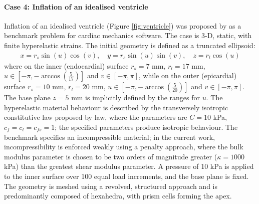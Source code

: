 \documentclass[sn-mathphys,Numbered]{sn-jnl}%
\begin{document}



\paragraph{Case 4: Inflation of an idealised ventricle}
Inflation of an idealised ventricle (Figure \ref{fig:ventricle}) was proposed by \citet{Land2015} as a benchmark problem for cardiac mechanics software.
The case is 3-D, static, with finite hyperelastic strains.
The initial geometry is defined as a truncated ellipsoid:
\begin{eqnarray}
	x = r_s \sin(u) \cos(v), \quad
	y = r_s \sin(u) \sin(v), \quad
	z = r_l \cos(u)
\end{eqnarray}
where on the inner (endocardial) surface $r_s =7$ mm, $r_l = 17$ mm, $u \in \left[-\pi, -\arccos \left( \frac{5}{17} \right) \right]$ and $v \in \left[-\pi, \pi \right]$, while on the outer (epicardial) surface $r_s =10$ mm, $r_l = 20$ mm, $u \in \left[-\pi, -\arccos \left( \frac{5}{20} \right) \right]$ and $v \in \left[-\pi, \pi \right]$.
The base plane $z = 5$ mm is implicitly defined by the ranges for $u$.
The hyperelastic material behaviour is described by the transversely isotropic constitutive law proposed by \citet{Guccione1995} law, where the parameters are $C = 10$ kPa, $c_f = c_t = c_{fs} = 1$; the specified parameters produce isotropic behaviour.
The benchmark specifies an incompressible material; in the current work, incompressibility is enforced weakly using a penalty approach, where the bulk modulus parameter is chosen to be two orders of magnitude greater ($\kappa = 1000$ kPa) than the greatest shear modulus parameter.
A pressure of 10 kPa is applied to the inner surface over 100 equal load increments, and the base plane is fixed.
The geometry is meshed using a revolved, structured approach and is predominantly composed of hexahedra, with prism cells forming the apex.
\end{document}
